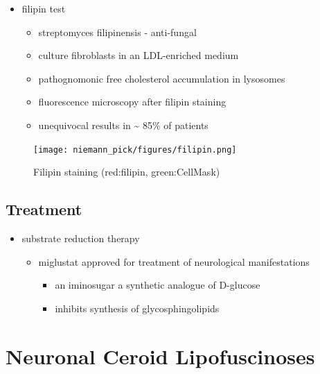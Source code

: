 \documentclass[12pt]{scrartcl}
\begin{document}
\begin{itemize}
\item filipin test
\begin{itemize}
\item streptomyces filipinensis - anti-fungal
\item culture fibroblasts in an LDL-enriched medium
\item pathognomonic free cholesterol accumulation in lysosomes
\item fluorescence microscopy after filipin staining
\item unequivocal results in \textasciitilde{} 85\% of patients
\end{itemize}
\end{itemize}

\begin{figure}[htbp]
\centering
\texttt{[image: niemann\_pick/figures/filipin.png]}
\caption{\label{fig:org20bddea}Filipin staining (red:filipin, green:CellMask)}
\end{figure}

\subsection{Treatment}
\label{sec:org168460a}
\begin{itemize}
\item substrate reduction therapy
\begin{itemize}
\item miglustat approved for treatment of neurological manifestations
\begin{itemize}
\item an iminosugar a synthetic analogue of D-glucose
\item inhibits synthesis of glycosphingolipids
\end{itemize}
\end{itemize}
\end{itemize}

\section{Neuronal Ceroid Lipofuscinoses}
\label{sec:org5aee14e}
\end{document}
